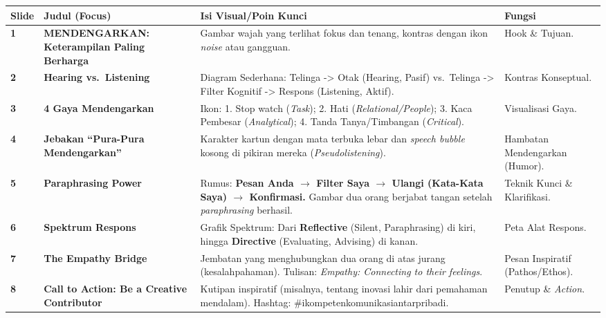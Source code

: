 \documentclass[
  letterpaper,
  DIV=11,
  numbers=noendperiod]{scrreprt}
\begin{document}
\begin{longtable}[]{@{}
  >{\centering\arraybackslash}p{}
  >{\raggedright\arraybackslash}p{}
  >{\raggedright\arraybackslash}p{}
  >{\raggedright\arraybackslash}p{}@{}}
\toprule\noalign{}
\begin{minipage}[b]{\linewidth}\centering
Slide
\end{minipage} & \begin{minipage}[b]{\linewidth}\raggedright
Judul (Focus)
\end{minipage} & \begin{minipage}[b]{\linewidth}\raggedright
Isi Visual/Poin Kunci
\end{minipage} & \begin{minipage}[b]{\linewidth}\raggedright
Fungsi
\end{minipage} \\
\midrule\noalign{}
\endhead
\bottomrule\noalign{}
\endlastfoot
\textbf{1} & \textbf{MENDENGARKAN: Keterampilan Paling Berharga} &
Gambar wajah yang terlihat fokus dan tenang, kontras dengan ikon
\emph{noise} atau gangguan. & Hook \& Tujuan. \\
\textbf{2} & \textbf{Hearing vs.~Listening} & Diagram Sederhana: Telinga
-\textgreater{} Otak (Hearing, Pasif) vs.~Telinga -\textgreater{} Filter
Kognitif -\textgreater{} Respons (Listening, Aktif). & Kontras
Konseptual. \\
\textbf{3} & \textbf{4 Gaya Mendengarkan} & 4 Ikon: 1. Stop watch
(\emph{Task}); 2. Hati (\emph{Relational/People}); 3. Kaca Pembesar
(\emph{Analytical}); 4. Tanda Tanya/Timbangan (\emph{Critical}). &
Visualisasi Gaya. \\
\textbf{4} & \textbf{Jebakan ``Pura-Pura Mendengarkan''} & Karakter
kartun dengan mata terbuka lebar dan \emph{speech bubble} kosong di
pikiran mereka (\emph{Pseudolistening}). & Hambatan Mendengarkan
(Humor). \\
\textbf{5} & \textbf{Paraphrasing Power} & Rumus: \textbf{Pesan Anda
\(\rightarrow\) Filter Saya \(\rightarrow\) Ulangi (Kata-Kata Saya)
\(\rightarrow\) Konfirmasi.} Gambar dua orang berjabat tangan setelah
\emph{paraphrasing} berhasil. & Teknik Kunci \& Klarifikasi. \\
\textbf{6} & \textbf{Spektrum Respons} & Grafik Spektrum: Dari
\textbf{Reflective} (Silent, Paraphrasing) di kiri, hingga
\textbf{Directive} (Evaluating, Advising) di kanan. & Peta Alat
Respons. \\
\textbf{7} & \textbf{The Empathy Bridge} & Jembatan yang menghubungkan
dua orang di atas jurang (kesalahpahaman). Tulisan: \emph{Empathy:
Connecting to their feelings}. & Pesan Inspiratif (Pathos/Ethos). \\
\textbf{8} & \textbf{Call to Action: Be a Creative Contributor} &
Kutipan inspiratif (misalnya, tentang inovasi lahir dari pemahaman
mendalam). Hashtag: \#ikompetenkomunikasiantarpribadi. & Penutup \&
\emph{Action}. \\
\end{longtable}
\end{document}

